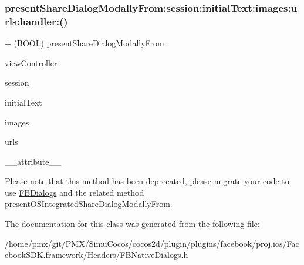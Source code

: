 \subsubsection{\texorpdfstring{present\+Share\+Dialog\+Modally\+From\+:session\+:initial\+Text\+:images\+:urls\+:handler\+:()}{presentShareDialogModallyFrom:session:initialText:images:urls:handler:()}\hspace{0.1cm}{\footnotesize\ttfamily [5/5]}}
{\footnotesize\ttfamily + (B\+O\+OL) present\+Share\+Dialog\+Modally\+From\+: \begin{DoxyParamCaption}\item[{(U\+I\+View\+Controller $\ast$)}]{view\+Controller }\item[{session:(\hyperlink{interfaceFBSession}{F\+B\+Session} $\ast$)}]{session }\item[{initialText:(N\+S\+String $\ast$)}]{initial\+Text }\item[{images:(N\+S\+Array $\ast$)}]{images }\item[{urls:(N\+S\+Array $\ast$)}]{urls }\item[{handler:((deprecated))}]{\+\_\+\+\_\+attribute\+\_\+\+\_\+ }\end{DoxyParamCaption}}

Please note that this method has been deprecated, please migrate your code to use {\ttfamily \hyperlink{interfaceFBDialogs}{F\+B\+Dialogs}} and the related method {\ttfamily present\+O\+S\+Integrated\+Share\+Dialog\+Modally\+From}. 

The documentation for this class was generated from the following file\+:\begin{DoxyCompactItemize}
\item 
/home/pmx/git/\+P\+M\+X/\+Simu\+Cocos/cocos2d/plugin/plugins/facebook/proj.\+ios/\+Facebook\+S\+D\+K.\+framework/\+Headers/F\+B\+Native\+Dialogs.\+h\end{DoxyCompactItemize}
